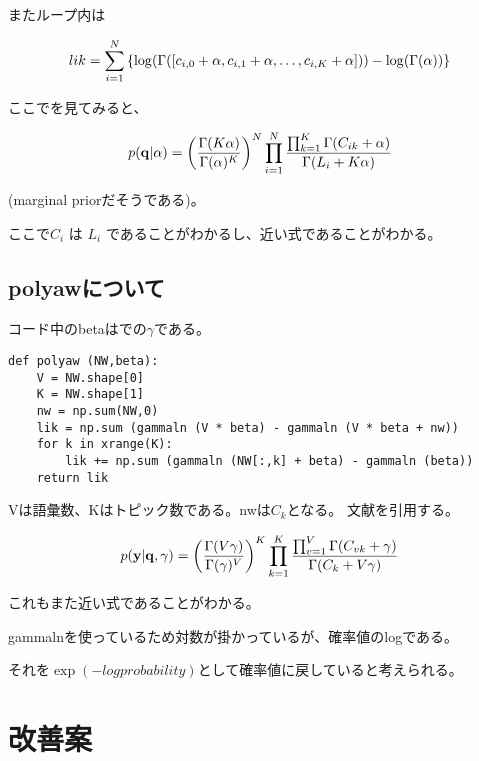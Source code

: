 \documentclass[uplatex]{jsarticle}
\begin{document}
またループ内は

\begin{equation}
lik = \sum_{i=1}^{N} \left\{ \log (\Gamma([c_{i,0} + \alpha, c_{i,1} + \alpha, \ldots, c_{i,K} + \alpha\protect])) - \log(\Gamma(\alpha)) \right\}
\end{equation}

ここで\cite{murphy}を見てみると、

\begin{equation}
p({\bf q} | \alpha) = \left(\frac{\Gamma(K\alpha)}{\Gamma(\alpha)^K}\right)^{N}
\prod_{i=1}^{N} \frac{\prod_{k=1}^{K} \Gamma(C_{ik} + \alpha)}{\Gamma(L_i + K\alpha)}
\end{equation}

(marginal priorだそうである)。

ここで$C_i$ は $L_i$ であることがわかるし、近い式であることがわかる。

\subsection{polyawについて}
コード中のbetaは\cite{murphy}での$\gamma$である。
\begin{lstlisting}
def polyaw (NW,beta):
    V = NW.shape[0]
    K = NW.shape[1]
    nw = np.sum(NW,0)
    lik = np.sum (gammaln (V * beta) - gammaln (V * beta + nw))
    for k in xrange(K):
        lik += np.sum (gammaln (NW[:,k] + beta) - gammaln (beta))
    return lik
\end{lstlisting}

Vは語彙数、Kはトピック数である。nwは$C_k$となる。
文献\cite{murphy}を引用する。

\begin{equation}
p({\bf y} | {\bf q}, \gamma) = \left(\frac{\Gamma(V\gamma)}{\Gamma(\gamma)^V}\right)^{K}
\prod_{k=1}^{K} \frac{\prod_{v=1}^{V} \Gamma(C_{vk} + \gamma)}{\Gamma(C_k + V\gamma)}
\end{equation}

これもまた近い式であることがわかる。

gammalnを使っているため対数が掛かっているが、確率値のlogである。

それを$\exp(-logprobability)$として確率値に戻していると考えられる。

\section{改善案}
\end{document}
